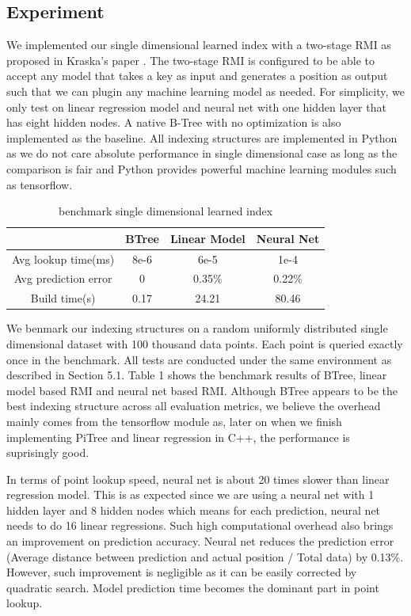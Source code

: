 \documentclass[sigconf,10pt]{acmart}
\begin{document}
\subsection{Experiment}

We implemented our single dimensional learned index with a two-stage RMI as proposed in 
Kraska's paper \cite{Learned_Index}. The two-stage RMI is configured to be able to accept
any model that takes a key as input and generates a position as output such that we can
plugin any machine learning model as needed. For simplicity, we only test on linear regression
model and neural net with one hidden layer that has eight hidden nodes. A native B-Tree with no optimization is also implemented
as the baseline. All indexing structures are implemented in Python as we do not care absolute
performance in single dimensional case as long as the comparison is fair and Python provides powerful
machine learning modules such as tensorflow. 

\begin{table}
  \centering
  \begin{tabular}{|c|c|c|c|}
    \hline
     & BTree & Linear Model & Neural Net \\
    \hline
    Avg lookup time(ms) & 8e-6 & 6e-5 & 1e-4 \\
    \hline 
    Avg prediction error & 0 & 0.35\% & 0.22\% \\
    \hline 
    Build time(s) & 0.17 & 24.21 & 80.46 \\
    \hline 
  \end{tabular}
  \caption{benchmark single dimensional learned index}
  \label{table:1}
\end{table}

We benmark our indexing structures on a random uniformly distributed single dimensional
dataset with 100 thousand data points. Each point is queried exactly once in the benchmark.
All tests are conducted under the same environment as described in Section 5.1. Table 1 shows
the benchmark results of BTree, linear model based RMI and neural net based RMI. Although
BTree appears to be the best indexing structure across all evaluation metrics, we believe the
overhead mainly comes from the tensorflow module as, later on when we finish implementing PiTree
and linear regression in C++, the performance is suprisingly good.

In terms of point lookup speed, neural net is about 20 times slower than linear regression model.
This is as expected since we are using a neural net with 1 hidden layer and 8 hidden nodes which
means for each prediction, neural net needs to do 16 linear regressions. Such high computational
overhead also brings an improvement on prediction accuracy. Neural net reduces the prediction
error (Average distance between prediction and actual position / Total data) by 0.13\%. However,
such improvement is negligible as it can be easily corrected by quadratic search. Model prediction
time becomes the dominant part in point lookup.
\end{document}
